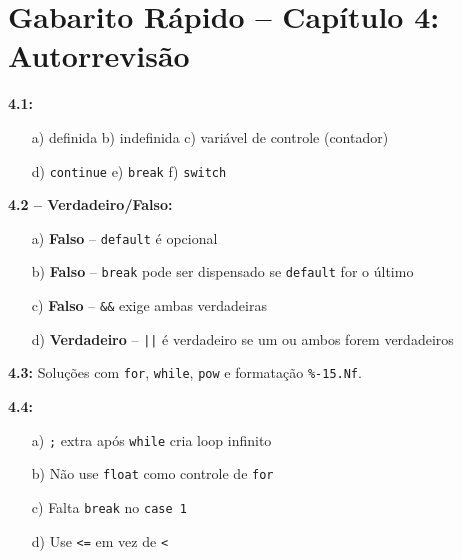 \documentclass[12pt,a4paper]{article}
\begin{document}
\newpage

\section*{Gabarito Rápido -- Capítulo 4: Autorrevisão}

\begin{tcolorbox}[colback=deitellightblue,colframe=deitelblue,title={\bfseries\large Respostas Resumidas}]

\textbf{4.1:}
\begin{itemize}[noitemsep]
  \item[a)] definida \quad b) indefinida \quad c) variável de controle (contador)
  \item[d)] \texttt{continue} \quad e) \texttt{break} \quad f) \texttt{switch}
\end{itemize}

\medskip\textbf{4.2 -- Verdadeiro/Falso:}
\begin{itemize}[noitemsep]
  \item[a)] \textcolor{deitelred}{\textbf{Falso}} -- \texttt{default} é opcional
  \item[b)] \textcolor{deitelred}{\textbf{Falso}} -- \texttt{break} pode ser dispensado se \texttt{default} for o último
  \item[c)] \textcolor{deitelred}{\textbf{Falso}} -- \texttt{\&\&} exige ambas verdadeiras
  \item[d)] \textcolor{deitelgreen}{\textbf{Verdadeiro}} -- \texttt{||} é verdadeiro se um ou ambos forem verdadeiros
\end{itemize}

\medskip\textbf{4.3:} Soluções com \texttt{for}, \texttt{while}, \texttt{pow} e formatação \texttt{\%-15.Nf}.

\medskip\textbf{4.4:}
\begin{itemize}[noitemsep]
  \item[a)] \texttt{;} extra após \texttt{while} cria loop infinito
  \item[b)] Não use \texttt{float} como controle de \texttt{for}
  \item[c)] Falta \texttt{break} no \texttt{case 1}
  \item[d)] Use \texttt{<=} em vez de \texttt{<}
\end{itemize}

\end{tcolorbox}
\end{document}
